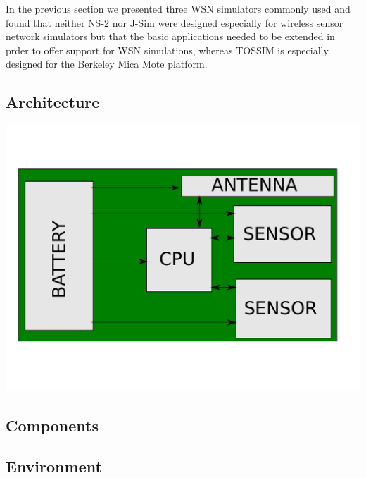 In the previous section we presented three WSN simulators commonly used and 
found that neither NS-2 nor J-Sim were designed especially for wireless 
sensor network simulators but that the basic applications needed to be extended
in prder to offer support for WSN simulations, whereas TOSSIM is especially designed
for the Berkeley Mica Mote platform.
\subsection{Architecture}
\begin{center}
	\includegraphics[scale=0.6]{img/board.pdf}
\end{center}

\subsection{Components}
\subsection{Environment}

